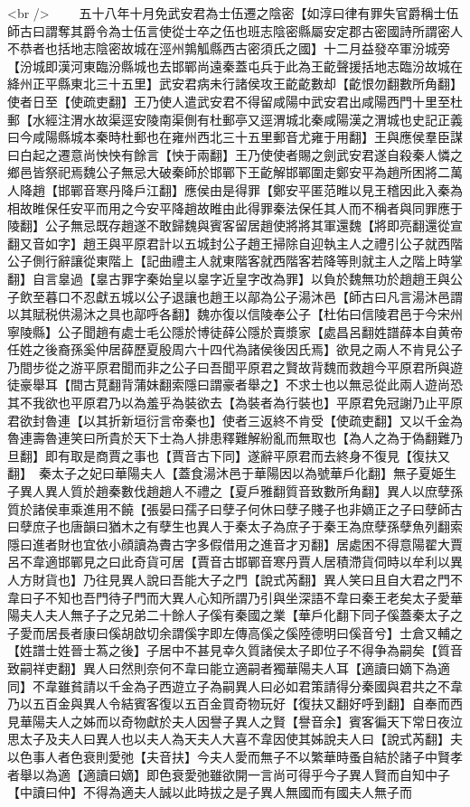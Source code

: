 <br />
　　五十八年十月免武安君為士伍遷之陰密【如淳曰律有罪失官爵稱士伍師古曰謂奪其爵令為士伍言使從士卒之伍也班志陰密縣屬安定郡古密國詩所謂密人不恭者也括地志陰密故城在涇州鶉觚縣西古密須氏之國】十二月益發卒軍汾城旁【汾城即漢河東臨汾縣城也去邯鄲尚遠秦蓋屯兵于此為王齕聲援括地志臨汾故城在絳州正平縣東北三十五里】武安君病未行諸侯攻王齕齕數却【齕恨勿翻數所角翻】使者日至【使疏吏翻】王乃使人遣武安君不得留咸陽中武安君出咸陽西門十里至杜郵【水經注渭水故渠逕安陵南渠側有杜郵亭又逕渭城北秦咸陽漢之渭城也史記正義曰今咸陽縣城本秦時杜郵也在雍州西北三十五里郵音尤雍于用翻】王與應侯羣臣謀曰白起之遷意尚怏怏有餘言【怏于兩翻】王乃使使者賜之劍武安君遂自殺秦人憐之鄉邑皆祭祀焉魏公子無忌大破秦師於邯鄲下王齕解邯鄲圍走鄭安平為趙所困將二萬人降趙【邯鄲音寒丹降戶江翻】應侯由是得罪【鄭安平匿范睢以見王稽因此入秦為相故睢保任安平而用之今安平降趙故睢由此得罪秦法保任其人而不稱者與同罪應于陵翻】公子無忌既存趙遂不敢歸魏與賓客留居趙使將將其軍還魏【將即亮翻還從宣翻又音如字】趙王與平原君計以五城封公子趙王掃除自迎執主人之禮引公子就西階公子側行辭讓從東階上【記曲禮主人就東階客就西階客若降等則就主人之階上時掌翻】自言辠過【辠古罪字秦始皇以辠字近皇字改為罪】以負於魏無功於趙趙王與公子飲至暮口不忍獻五城以公子退讓也趙王以鄗為公子湯沐邑【師古曰凡言湯沐邑謂以其賦税供湯沐之具也鄗呼各翻】魏亦復以信陵奉公子【杜佑曰信陵君邑于今宋州寧陵縣】公子聞趙有處士毛公隱於博徒薛公隱於賣漿家【處昌呂翻姓譜薛本自黄帝任姓之後裔孫奚仲居薛歷夏殷周六十四代為諸侯後因氏焉】欲見之兩人不肯見公子乃間步從之游平原君聞而非之公子曰吾聞平原君之賢故背魏而救趙今平原君所與遊徒豪舉耳【間古莧翻背蒲妹翻索隱曰謂豪者舉之】不求士也以無忌從此兩人遊尚恐其不我欲也平原君乃以為羞乎為裝欲去【為裝者為行裝也】平原君免冠謝乃止平原君欲封魯連【以其折新垣衍言帝秦也】使者三返終不肯受【使疏吏翻】又以千金為魯連壽魯連笑曰所貴於天下士為人排患釋難解紛亂而無取也【為人之為于偽翻難乃旦翻】即有取是商賈之事也【賈音古下同】遂辭平原君而去終身不復見【復扶又翻】　秦太子之妃曰華陽夫人【蓋食湯沐邑于華陽因以為號華戶化翻】無子夏姫生子異人異人質於趙秦數伐趙趙人不禮之【夏戶雅翻質音致數所角翻】異人以庶孽孫質於諸侯車乘進用不饒【張晏曰孺子曰孽子何休曰孽子賤子也非嫡正之子曰孽師古曰孽庶子也唐韻曰猶木之有孽生也異人于秦太子為庶子于秦王為庶孽孫孽魚列翻索隱曰進者財也宜依小顔讀為賮古字多假借用之進音才刃翻】居處困不得意陽翟大賈呂不韋適邯鄲見之曰此奇貨可居【賈音古邯鄲音寒丹賈人居積滯貨伺時以牟利以異人方財貨也】乃往見異人說曰吾能大子之門【說式芮翻】異人笑曰且自大君之門不韋曰子不知也吾門待子門而大異人心知所謂乃引與坐深語不韋曰秦王老矣太子愛華陽夫人夫人無子子之兄弟二十餘人子傒有秦國之業【華戶化翻下同子傒蓋秦太子之子愛而居長者康曰傒胡啟切余謂傒字即左傳高傒之傒陸德明曰傒音兮】士倉又輔之【姓譜士姓晉士蒍之後】子居中不甚見幸久質諸侯太子即位子不得争為嗣矣【質音致嗣祥吏翻】異人曰然則奈何不韋曰能立適嗣者獨華陽夫人耳【適讀曰嫡下為適同】不韋雖貧請以千金為子西遊立子為嗣異人曰必如君策請得分秦國與君共之不韋乃以五百金與異人令結賓客復以五百金買奇物玩好【復扶又翻好呼到翻】自奉而西見華陽夫人之姊而以奇物獻於夫人因譽子異人之賢【譽音余】賓客徧天下常日夜泣思太子及夫人曰異人也以夫人為天夫人大喜不韋因使其姊說夫人曰【說式芮翻】夫以色事人者色衰則愛弛【夫音扶】今夫人愛而無子不以繁華時蚤自結於諸子中賢孝者舉以為適【適讀曰嫡】即色衰愛弛雖欲開一言尚可得乎今子異人賢而自知中子【中讀曰仲】不得為適夫人誠以此時拔之是子異人無國而有國夫人無子而